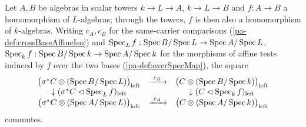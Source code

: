 \begin{theorem}
  \label{pa-thm:crossBaseAffineIso_naturality}
  \leanok

  Let \(A, B\) be algebras in scalar towers \(k \to L \to A\), \(k \to L \to B\) and
  \(f : A \to B\) a homomorphism of \(L\)-algebras; through the towers, \(f\) is then
  also a homomorphism of \(k\)-algebras. Writing \(c_A, c_B\) for the same-carrier
  comparisons (\ref{pa-def:crossBaseAffineIso}) and \(\operatorname{Spec}_L f : \operatorname{Spec} B/\operatorname{Spec} L \to
  \operatorname{Spec} A/\operatorname{Spec} L\), \(\operatorname{Spec}_k f : \operatorname{Spec} B/\operatorname{Spec} k \to \operatorname{Spec} A/\operatorname{Spec} k\) for the
  morphisms of affine tests induced by \(f\) over the two bases (\ref{pa-def:overSpecMap}),
  the square
  \[
    \begin{array}{ccc}
      \bigl(\sigma^{*}C \otimes (\operatorname{Spec} B/\operatorname{Spec} L)\bigr)_{\mathrm{left}} &
        \xrightarrow{\ c_B\ } &
        \bigl(C \otimes (\operatorname{Spec} B/\operatorname{Spec} k)\bigr)_{\mathrm{left}} \\
      \downarrow (\sigma^{*}C \lhd \operatorname{Spec}_L f)_{\mathrm{left}} & &
        \downarrow (C \lhd \operatorname{Spec}_k f)_{\mathrm{left}} \\
      \bigl(\sigma^{*}C \otimes (\operatorname{Spec} A/\operatorname{Spec} L)\bigr)_{\mathrm{left}} &
        \xrightarrow{\ c_A\ } &
        \bigl(C \otimes (\operatorname{Spec} A/\operatorname{Spec} k)\bigr)_{\mathrm{left}}
    \end{array}
  \]
  commutes.
\end{theorem}
